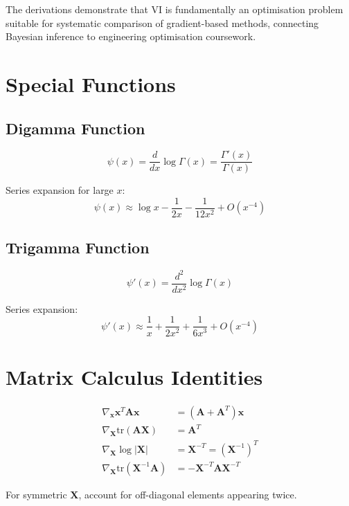 \documentclass[11pt]{article}
\newcommand{\tr}{\text{tr}}
\begin{document}
The derivations demonstrate that VI is fundamentally an optimisation problem suitable for systematic comparison of gradient-based methods, connecting Bayesian inference to engineering optimisation coursework.

\appendix

\section{Special Functions}

\subsection{Digamma Function}
\begin{equation}
\psi(x) = \frac{d}{dx}\log \Gamma(x) = \frac{\Gamma'(x)}{\Gamma(x)}
\end{equation}

Series expansion for large $x$:
\begin{equation}
\psi(x) \approx \log x - \frac{1}{2x} - \frac{1}{12x^2} + O(x^{-4})
\end{equation}

\subsection{Trigamma Function}
\begin{equation}
\psi'(x) = \frac{d^2}{dx^2}\log \Gamma(x)
\end{equation}

Series expansion:
\begin{equation}
\psi'(x) \approx \frac{1}{x} + \frac{1}{2x^2} + \frac{1}{6x^3} + O(x^{-4})
\end{equation}

\section{Matrix Calculus Identities}

\begin{align}
\nabla_{\bm{x}} \bm{x}^T\bm{A}\bm{x} &= (\bm{A} + \bm{A}^T)\bm{x}\\
\nabla_{\bm{X}} \tr(\bm{A}\bm{X}) &= \bm{A}^T\\
\nabla_{\bm{X}} \log |\bm{X}| &= \bm{X}^{-T} = (\bm{X}^{-1})^T\\
\nabla_{\bm{X}} \tr(\bm{X}^{-1}\bm{A}) &= -\bm{X}^{-T}\bm{A}\bm{X}^{-T}
\end{align}

For symmetric $\bm{X}$, account for off-diagonal elements appearing twice.
\end{document}
